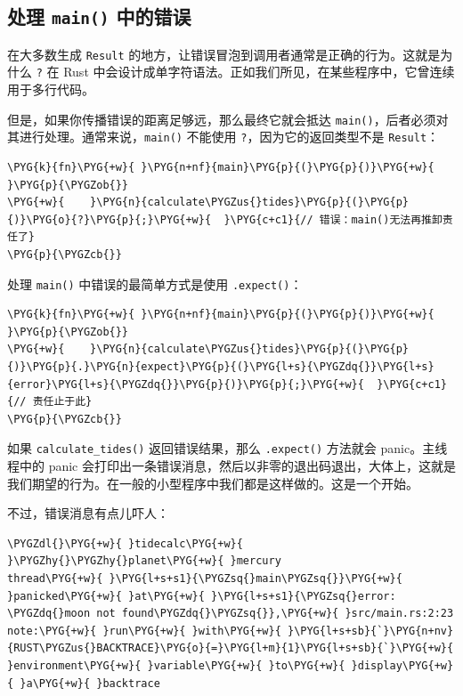 \subsection{处理 \texttt{main()} 中的错误}

在大多数生成 \texttt{Result} 的地方，让错误冒泡到调用者通常是正确的行为。这就是为什么 \texttt{?} 在 Rust 中会设计成单字符语法。正如我们所见，在某些程序中，它曾连续用于多行代码。

但是，如果你传播错误的距离足够远，那么最终它就会抵达 \texttt{main()}，后者必须对其进行处理。通常来说，\texttt{main()} 不能使用 \texttt{?}，因为它的返回类型不是 \texttt{Result}：

\begin{Verbatim}[commandchars=\\\{\},breaklines=true,breakanywhere=true,fontsize=\codefont,xleftmargin=17bp]
\PYG{k}{fn}\PYG{+w}{ }\PYG{n+nf}{main}\PYG{p}{(}\PYG{p}{)}\PYG{+w}{ }\PYG{p}{\PYGZob{}}
\PYG{+w}{    }\PYG{n}{calculate\PYGZus{}tides}\PYG{p}{(}\PYG{p}{)}\PYG{o}{?}\PYG{p}{;}\PYG{+w}{  }\PYG{c+c1}{// 错误：main()无法再推卸责任了}
\PYG{p}{\PYGZcb{}}
\end{Verbatim}

处理 \texttt{main()} 中错误的最简单方式是使用 \texttt{.expect()}：

\begin{Verbatim}[commandchars=\\\{\},breaklines=true,breakanywhere=true,fontsize=\codefont,xleftmargin=17bp]
\PYG{k}{fn}\PYG{+w}{ }\PYG{n+nf}{main}\PYG{p}{(}\PYG{p}{)}\PYG{+w}{ }\PYG{p}{\PYGZob{}}
\PYG{+w}{    }\PYG{n}{calculate\PYGZus{}tides}\PYG{p}{(}\PYG{p}{)}\PYG{p}{.}\PYG{n}{expect}\PYG{p}{(}\PYG{l+s}{\PYGZdq{}}\PYG{l+s}{error}\PYG{l+s}{\PYGZdq{}}\PYG{p}{)}\PYG{p}{;}\PYG{+w}{  }\PYG{c+c1}{// 责任止于此}
\PYG{p}{\PYGZcb{}}
\end{Verbatim}

如果 \texttt{calculate\_tides()} 返回错误结果，那么 \texttt{.expect()} 方法就会 panic。主线程中的 panic 会打印出一条错误消息，然后以非零的退出码退出，大体上，这就是我们期望的行为。在一般的小型程序中我们都是这样做的。这是一个开始。

不过，错误消息有点儿吓人：

\begin{Verbatim}[commandchars=\\\{\},breaklines=true,breakanywhere=true,fontsize=\codefont,xleftmargin=17bp]
\PYGZdl{}\PYG{+w}{ }tidecalc\PYG{+w}{ }\PYGZhy{}\PYGZhy{}planet\PYG{+w}{ }mercury
thread\PYG{+w}{ }\PYG{l+s+s1}{\PYGZsq{}main\PYGZsq{}}\PYG{+w}{ }panicked\PYG{+w}{ }at\PYG{+w}{ }\PYG{l+s+s1}{\PYGZsq{}error: \PYGZdq{}moon not found\PYGZdq{}\PYGZsq{}},\PYG{+w}{ }src/main.rs:2:23
note:\PYG{+w}{ }run\PYG{+w}{ }with\PYG{+w}{ }\PYG{l+s+sb}{`}\PYG{n+nv}{RUST\PYGZus{}BACKTRACE}\PYG{o}{=}\PYG{l+m}{1}\PYG{l+s+sb}{`}\PYG{+w}{ }environment\PYG{+w}{ }variable\PYG{+w}{ }to\PYG{+w}{ }display\PYG{+w}{ }a\PYG{+w}{ }backtrace
\end{Verbatim}

